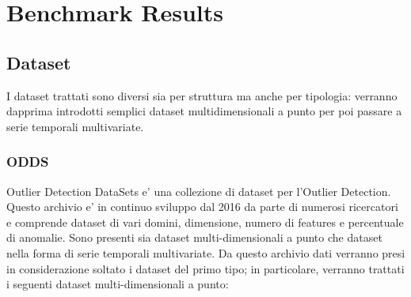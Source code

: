 \section{Benchmark Results}
\subsection{Dataset}
I dataset trattati sono diversi sia per struttura ma anche per tipologia: verranno dapprima introdotti semplici dataset multidimensionali a punto per poi passare a serie temporali multivariate. 

\subsubsection{ODDS}
Outlier Detection DataSets e' una collezione di dataset per l'Outlier Detection. Questo archivio e' in continuo sviluppo dal 2016 da parte di numerosi ricercatori e comprende dataset di vari domini, dimensione, numero di features e percentuale di anomalie. 
Sono presenti sia dataset multi-dimensionali a punto che dataset nella forma di serie temporali multivariate. Da questo archivio dati verranno presi in considerazione soltato i dataset del primo tipo; in particolare, verranno trattati i seguenti dataset multi-dimensionali a punto:


